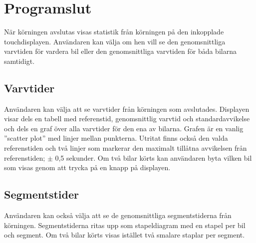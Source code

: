 \section{Programslut}
\label{sec:programslut}

När körningen avslutas visas statistik från körningen på den inkopplade
touchdisplayen. Användaren kan välja om hen vill se den genomsnittliga varvtiden
för vardera bil eller den genomsnittliga varvtiden för båda bilarna samtidigt.

\subsection{Varvtider}

Användaren kan välja att se varvtider från körningen som avslutades. Displayen
visar dels en tabell med referenstid, genomsnittlig varvtid och
standardavvikelse och dels en graf över alla varvtider för den ena av bilarna.
Grafen är en vanlig ''scatter plot'' med linjer mellan punkterna. Utritat finns
också den valda referenstiden och två linjer som markerar den maximalt tillåtna
avvikelsen från referenstiden; $\pm$ 0,5 sekunder. Om två bilar körts kan
användaren byta vilken bil som visas genom att trycka på en knapp på displayen.

\subsection{Segmentstider}

Användaren kan också välja att se de genomsnittliga segmentstiderna från
körningen. Segmentstiderna ritas upp som stapeldiagram med en stapel per bil och
segment. Om två bilar körts visas istället två smalare staplar per segment.

